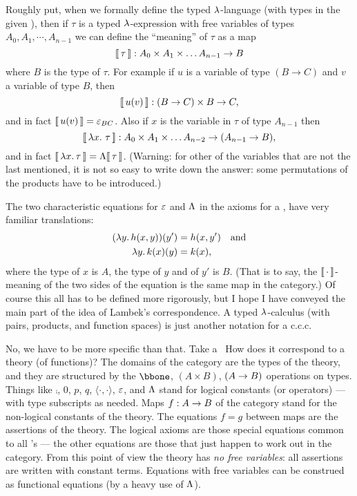 Roughly put, when we formally define the typed $\lambda$-language (with types in the given
\ccc), then if $\tau$ is a typed $\lambda$-expression with free variables of types $A_0,
A_1,\cdots, A_{n-1}$ we can define the ``meaning'' of $\tau$ as a map
%
$$
\llbracket\, \tau \,\rrbracket: A_0 \times A_1 \times \dots A_{n-1} \rightarrow B
$$
%
where $B$ is the type of $\tau$. For example if $u$ is a variable of type $(B \to C)$ and
$v$ a variable of type $B$, then
$$
\llbracket\, u(v) \,\rrbracket: (B \rightarrow C) \times B \rightarrow C,
$$
%
and in fact $\llbracket\, u(v) \,\rrbracket = \varepsilon_{BC}$. Also if $x$ is the variable in $\tau$ of type $A_{n-1}$
then
$$
\means{\lm{x}.\, \tau}: A_0 \times A_1 \times \dots A_{n-2} \to (A_{n-1} \to B),
$$
%
and in fact $\llbracket\, \lambda x.\, \tau \,\rrbracket = \Lambda\llbracket\, \tau \,\rrbracket$. (Warning: for other of the variables
that are not the last mentioned, it is not so easy to write down the answer: some
permutations of the products have to be introduced.)

The two characteristic equations for $\varepsilon$ and $\Lambda$ in the axioms for a \ccc, have very
familiar translations:
\begin{align*}
( \lm{y}. h(x,y))(y') &= h(x,y') \quad {\textrm {and}} \\
\lm{y}. k(x)(y) &= k(x),
\end{align*}
%
where the type of $x$ is $A$, the type of $y$ and of $y'$ is $B$. (That is to say, the
$\llbracket\, \cdot \,\rrbracket$-meaning of the two sides of the equation is the same map in the category.)
Of course this all has to be defined more rigorously, but I hope I have conveyed the main
part of the idea of Lambek's correspondence. A typed $\lambda$-calculus (with pairs, products,
and function spaces) is just another notation for a {c.c.c}.

No, we have to be more specific than that. Take a \ccc\ How does it correspond to a theory
(of functions)? The domains of the category are the types of the theory, and they are
structured by the $\bbone$, $(A \times B)$, $(A \rightarrow B)$ operations on types. Things like
$\comp$, $0$, $p$, $q$, $\langle\cdot,\cdot\rangle$, $\varepsilon$, and $\Lambda$ stand for logical
constants (or operators) --- with type subscripts as needed. Maps $f : A \rightarrow B$ of the
category stand for the non-logical constants of the theory. The equations $f = g$ between
maps are the assertions of the theory. The logical axioms are those special equations
common to all \ccc's --- the other equations are those that just happen to work out in the
category. From this point of view the theory has {\it no free variables}: all assertions
are written with constant terms. Equations with free variables can be construed as
functional equations (by a heavy use of $\Lambda$).

